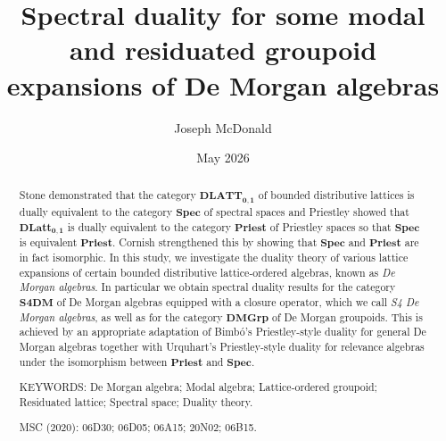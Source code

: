 \documentclass{amsart}
\theoremstyle{plain}
\theoremstyle{definition}
\begin{document}
\title[Spectral duality for  De Morgan algebras]{Spectral duality for some modal and residuated groupoid expansions of De Morgan algebras}
\author{Joseph McDonald }
\address{Institute of Computer Science, Czech Academy of Sciences}

\date{May 2026}
\maketitle

\begin{abstract} 
Stone demonstrated that the category $\mathbf{DLATT_{0,1}}$ of bounded distributive lattices is dually equivalent to the category  $\mathbf{Spec}$ of spectral spaces and Priestley showed that $\mathbf{DLatt_{0,1}}$ is dually equivalent to the category $\mathbf{Priest}$ of Priestley spaces so that $\mathbf{Spec}$ is equivalent $\mathbf{Priest}$. Cornish strengthened this by showing that $\mathbf{Spec}$ and $\mathbf{Priest}$ are in fact isomorphic. In this study, we investigate the duality theory of various lattice expansions of certain bounded distributive lattice-ordered algebras, known as \emph{De Morgan algebras}. In particular we obtain spectral duality results for the category $\mathbf{S4DM}$ of De Morgan algebras equipped with a closure operator, which we call \emph{S4 De Morgan algebras}, as well as for the category $\mathbf{DMGrp}$ of De Morgan groupoids. This is achieved by an appropriate adaptation of Bimb\'o's Priestley-style duality for general De Morgan algebras together with Urquhart's Priestley-style duality for relevance algebras under the isomorphism between $\mathbf{Priest}$ and $\mathbf{Spec}$.
\par
\vspace{.2cm}
\noindent KEYWORDS: De Morgan algebra; Modal algebra; Lattice-ordered groupoid; Residuated lattice; Spectral space; Duality theory.   
\par
\vspace{.2cm}
\noindent MSC (2020): 06D30; 06D05; 06A15; 20N02; 06B15.
\end{abstract}
\end{document}
